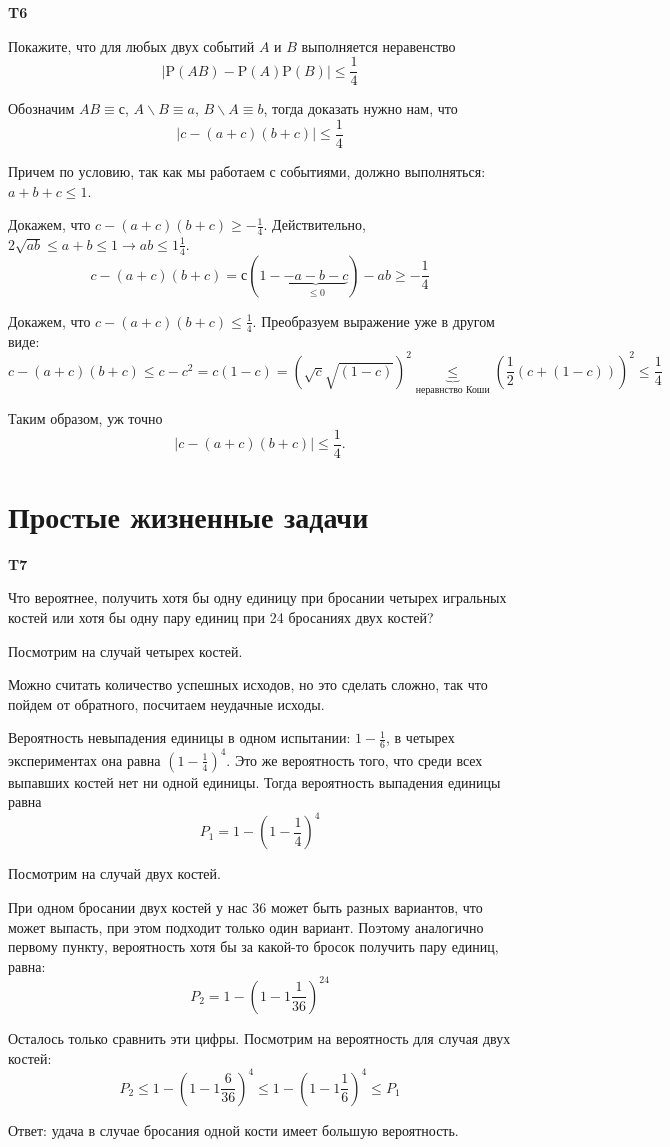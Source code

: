 \documentclass[a4paper,12pt]{article} %
\begin{document}
\begin{example}\textbf{T6}

Покажите, что для любых двух событий $A$ и $B$ выполняется неравенство
$$
|\mathrm{P}(A B)-\mathrm{P}(A) \mathrm{P}(B)| \leq \frac{1}{4}
$$

Обозначим $ A B\equiv с$, $ A\backslash B\equiv a$, $ B\backslash A\equiv b$, тогда доказать нужно нам, что
$$ |c-(a+c)(b+c)|\le \frac{1}{4} $$

Причем по условию, так как мы работаем с событиями, должно выполняться: $ a+b+c\le 1$.

Докажем, что $ c-(a+c)(b+c)\ge -\frac{1}{4}$. Действительно, $ 2\sqrt{ab}\le a+b\le 1 \rightarrow ab\le 1\frac{1}{4}$.
\[ c-(a+c)(b+c)=с(1-\underbrace{-a-b-c}_{\le 0})-ab \ge -\frac{1}{4}\]



Докажем, что $ c-(a+c)(b+c)\le \frac{1}{4}$. Преобразуем выражение уже в другом виде:
\[ c-(a+c)(b+c)\le c-c^2=c(1-c)=(\sqrt{c}\sqrt{(1-c)})^2\underbrace{\le}_{\text{неравнство Коши}}
\left(\frac{1}{2} ( c + ( 1-c ))
\right)^2 \le\frac{1}{4}\]

Таким образом, уж точно
$$ |c-(a+c)(b+c)|\le \frac{1}{4}. $$

\end{example}






\section{Простые жизненные задачи}


\begin{example}\textbf{T7}

Что вероятнее, получить хотя бы одну единицу при бросании четырех игральных костей 
или хотя бы одну пару единиц при 24 бросаниях двух костей?

Посмотрим на случай четырех костей.

Можно считать количество успешных исходов, но это сделать сложно, так что пойдем от обратного, посчитаем неудачные исходы.

Вероятность невыпадения единицы в одном испытании: $ 1-\frac{1}{6}$, в четырех экспериментах она равна $ (1-\frac{1}{4})^4$. 
Это же вероятность того, что среди всех выпавших костей нет ни одной единицы. 
Тогда вероятность выпадения единицы равна 
$$P_1= 1- (1-\frac{1}{4})^4$$


Посмотрим на случай двух костей.

При одном бросании двух костей у нас 36 может быть разных вариантов, что может выпасть, при этом подходит только один вариант.
Поэтому  аналогично первому пункту, вероятность хотя бы за какой-то бросок получить пару единиц, равна:
$$P_2= 1-(1-1\frac{1}{36})^{24} $$

Осталось только сравнить эти цифры. Посмотрим на вероятность для случая двух костей:
$$P_2\le 1-(1-1\frac{6}{36})^{4}\le 1-(1-1\frac{1}{6})^{4}\le P_1$$

Ответ: удача в случае бросания одной кости имеет большую вероятность.


\end{example}
\end{document}
